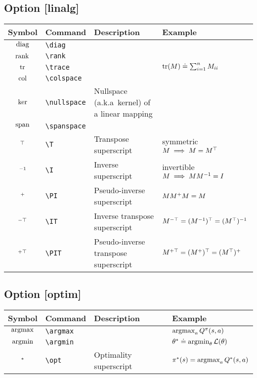 \documentclass{article}
\begin{document}
\subsection*{Option [linalg]}

\begin{tabular}{clll}
  \toprule
  Symbol & Command & Description & Example \\
  \midrule
  $\operatorname*{diag}$ & \verb|\diag| & & \\
  $\operatorname*{rank}$ & \verb|\rank| & & \\
  $\operatorname*{tr}$ & \verb|\trace| & & $\operatorname*{tr}(M) \doteq \sum_{i=1}^n M_{ii}$ \\
  $\operatorname*{col}$ & \verb|\colspace| & & \\
  $\operatorname*{ker}$ & \verb|\nullspace| & Nullspace (a.k.a\ kernel) of a linear mapping & \\
  $\operatorname*{span}$ & \verb|\spanspace| & & \\
  $^\top$ & \verb|\T| & Transpose superscript & symmetric $M \implies M = M^\top$ \\
  $^{-1}$ & \verb|\I| & Inverse superscript & invertible $M \implies MM^{-1} = I$ \\
  $^{+}$ & \verb|\PI| & Pseudo-inverse superscript & $MM^{+} M = M$ \\
  $^{-\top}$ & \verb|\IT| & Inverse transpose superscript & $M^{-\top} = (M^{-1})^\top = (M^\top)^{-1}$ \\
  $^{+\top}$ & \verb|\PIT| & Pseudo-inverse transpose superscript & $M^{+\top} = (M^{+})^\top = (M^\top)^{+}$ \\
  \bottomrule
\end{tabular}

\subsection*{Option [optim]}

\begin{tabular}{clll}
  \toprule
  Symbol & Command & Description & Example \\
  \midrule
  $\operatorname*{argmax}$ & \verb|\argmax| & & $\operatorname*{argmax}_a Q^{\pi}(s, a)$ \\
  $\operatorname*{argmin}$ & \verb|\argmin| & & $\theta^{*} \doteq \operatorname*{argmin}_\theta \mathcal{L}(\theta)$ \\
  $^{*}$ & \verb|\opt| & Optimality superscript & $\pi^{*}(s) = \operatorname*{argmax}_a Q^{*}(s, a)$ \\
  \bottomrule
\end{tabular}
\end{document}
